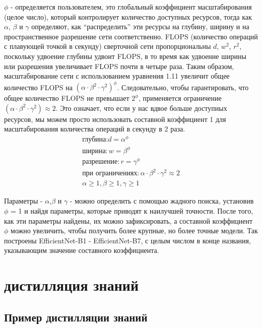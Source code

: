 \documentclass[oneside,final,12pt]{extreport}
\begin{document}
$\phi$ - определяется пользователем, это глобальный коэффициент масштабирования (целое число), который контролирует количество доступных ресурсов, тогда как $\alpha$, $\beta$ и $\gamma$ определяют, как “распределить” эти ресурсы на глубину, ширину и на пространственное разрешение сети соответственно. FLOPS (количество операций с плавующей точкой в секунду) сверточной сети пропорциональны $d$, $w^2$, $r^2$, поскольку удвоение глубины удвоит FLOPS, в то время как удвоение ширины или разрешения увеличивает FLOPS почти в четыре раза. Таким образом, масштабирование сети с использованием уравнения 1.11 увеличит общее количество FLOPS на $(\alpha \cdot \beta^2 \cdot \gamma^2) ^ \phi$. Следовательно, чтобы гарантировать, что общее количество FLOPS не превышает $2 ^ \phi$, применяется ограничение $(\alpha \cdot \beta^2 \cdot \gamma^2) \approx 2$. Это означает, что если у нас вдвое больше доступных ресурсов, мы можем просто использовать составной коэффициент 1 для масштабирования количества операций в секунду в 2 раза.
\begin{equation}
\begin{split}
\text{глубина:} d = \alpha^\phi\\
\text{ширина}: w = \beta^\phi\\
\text{разрешение}: r = \gamma^\phi\\
\text{при ограничениях}: \alpha \cdot \beta^2 \cdot \gamma^2 \approx 2\\
\alpha \geq 1, \beta \geq 1, \gamma \geq 1
\end{split}
\end{equation}

Параметры - $\alpha$,$\beta$ и $\gamma$ - можно определить с помощью жадного поиска, установив $\phi$ = 1 и найдя параметры, которые приводят к наилучшей точности. После того, как эти параметры найдены, их можно зафиксировать, а составной коэффициент $\phi$ можно увеличить, чтобы получить более крупные, но более точные модели. Так построены EfficientNet-B1 - EfficientNet-B7, с целым числом в конце названия, указывающим значение составного коэффициента.
\section{дистилляция знаний}
\subsection{Пример дистилляции знаний}
\end{document}

